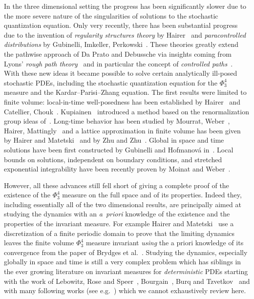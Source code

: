 \documentclass[a4paper,11pt]{article}
\newcommand{\tmtextit}[1]{{\itshape{#1}}}
\numberwithin{equation}{section}
\begin{document}
In the three dimensional setting the progress has been significantly slower due to the more
severe nature of the singularities of  solutions to the stochastic quantization
equation. Only very recently, there has been substantial progress due to the
invention of \tmtextit{regularity structures theory} by
Hairer~{\cite{hairer_theory_2014}} and \tmtextit{paracontrolled distributions}
by Gubinelli, Imkeller, Perkowski~{\cite{GIP}}. These  theories greatly
extend the pathwise approach of Da Prato and Debussche via insights coming
from Lyons' \tmtextit{rough path
theory}~{\cite{lyons_differential_1998,lyons_system_2002,lyons_differential_2007}}
and in particular the concept of \tmtextit{controlled
paths}~{\cite{gubinelli_controlling_2004,friz_course_2014}}. With these new ideas
it became possible to solve certain analytically ill-posed stochastic PDEs, including the
stochastic quantization equation for the $\Phi_3^4$ measure and the
Kardar--Parisi--Zhang equation. The first results were limited to finite
volume: local-in-time well-posedness has been established by
Hairer~{\cite{hairer_theory_2014}} and Catellier, Chouk~{\cite{CC}}.
Kupiainen~{\cite{kupiainen_renormalization_2016}} introduced a method based on the
renormalization group ideas of~\cite{gawpolhk_edzki_asymptotic_1986}. Long-time behavior has been studied by
Mourrat, Weber~{\cite{MWcomedown}}, Hairer,
Mattingly~{\cite{Hairer:2018:10.1214/17-AIHP840}} and a lattice approximation
in finite volume has been given by Hairer and Matetski~\cite{hairer_discretisations_2018} and by Zhu and Zhu~{\cite{ZZ18}}. 
Global in
space and time solutions have been first constructed by Gubinelli and
Hofmanov{\'a} in~{\cite{GH18}}. Local bounds on solutions, independent on
boundary conditions, and stretched exponential integrability have been
recently proven by Moinat and Weber~{\cite{moinat_space_time_2018}}.

However, all these advances  still fell short of giving a complete proof of the
existence of the $\Phi^4_3$ measure on the full space and of its properties.
Indeed they, including essentially all of the two dimensional
results, are principally aimed at studying the dynamics with an \tmtextit{a~priori} knowledge
of the existence and the properties of the invariant measure. For example Hairer and Matetski~\cite{hairer_discretisations_2018} use a discretization of a finite periodic domain to prove that the limiting dynamics leaves the finite volume $\Phi^4_3$ measure  invariant \emph{using} the a priori knowledge of its convergence from the paper of Brydges et al.~\cite{MR723546}. Studying the dynamics, especially globally in space and time   is still
a very complex problem which has siblings in the ever growing literature on
invariant measures for \tmtextit{deterministic} PDEs starting with the work of
Lebowitz, Rose and
Speer~{\cite{lebowitz_statistical_1988,lebowitz_statistical_1989}},
Bourgain~{\cite{bourgain_periodic_1994,bourgain_invariant_1996}}, Burq and
Tzvetkov~{\cite{burq_random_2008,burq_random_2008_1,tzvetkov_random_2016}} and with many following works (see e.g.~\cite{colliander_almost_2012, chatterjee_probabilistic_2012, nahmod_almost_2013, chatterjee_invariant_2014, benyi_probabilistic_2015}) which we cannot exhaustively review here.
\end{document}
